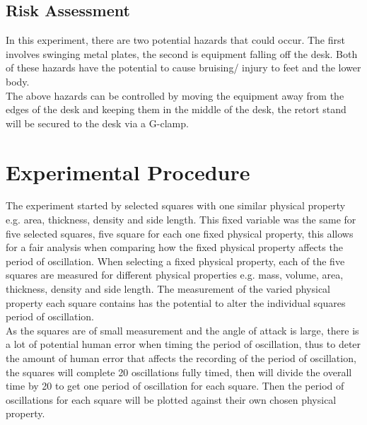 \documentclass[12pt]{article}
\begin{document}

\subsection{Risk Assessment}
\label{Risk Assessment SubSection}

In this experiment, there are two potential hazards that could occur. The first involves swinging metal plates, the second is equipment falling off the desk. Both of these hazards have the potential to cause bruising/ injury to feet and the lower body. \\

The above hazards can be controlled by moving the equipment away from the edges of the desk and keeping them in the middle of the desk, the retort stand will be secured to the desk via a G-clamp.


\section{Experimental Procedure}
\label{Experimental Procedure Section}

The experiment started by selected squares with one similar physical property e.g. area, thickness, density and side length. This fixed variable was the same for five selected squares, five square for each one fixed physical property, this allows for a fair analysis when comparing how the fixed physical property affects the period of oscillation. When selecting a fixed physical property, each of the five squares are measured for different physical properties e.g. mass, volume, area, thickness, density and side length. The measurement of the varied physical property each square contains has the potential to alter the individual squares period of oscillation. \\

As the squares are of small measurement and the angle of attack is large, there is a lot of potential human error when timing the period of oscillation, thus to deter the amount of human error that affects the recording of the period of oscillation, the squares will complete 20 oscillations fully timed, then will divide the overall time by 20 to get one period of oscillation for each square. Then the period of oscillations for each square will be plotted against their own chosen physical property. \\
\end{document}
